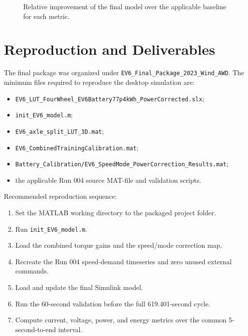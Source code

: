 \documentclass[11pt,letterpaper]{article}
\begin{document}
\begin{figure}[H]
\centering
{}
\caption{Relative improvement of the final model over the applicable baseline for each metric.}
\end{figure}

\section{Reproduction and Deliverables}

The final package was organized under
\texttt{EV6\_Final\_Package\_2023\_Wind\_AWD}. The minimum files required to
reproduce the desktop simulation are:

\begin{itemize}
  \item \texttt{EV6\_LUT\_FourWheel\_EV6Battery77p4kWh\_PowerCorrected.slx};
  \item \texttt{init\_EV6\_model.m};
  \item \texttt{EV6\_axle\_split\_LUT\_3D.mat};
  \item \texttt{EV6\_CombinedTrainingCalibration.mat};
  \item \texttt{Battery\_Calibration/EV6\_SpeedMode\_PowerCorrection\_Results.mat};
  \item the applicable Run 004 source MAT-file and validation scripts.
\end{itemize}

Recommended reproduction sequence:

\begin{enumerate}
  \item Set the MATLAB working directory to the packaged project folder.
  \item Run \texttt{init\_EV6\_model.m}.
  \item Load the combined torque gains and the speed/mode correction map.
  \item Recreate the Run 004 speed-demand timeseries and zero unused external commands.
  \item Load and update the final Simulink model.
  \item Run the 60-second validation before the full 619.401-second cycle.
  \item Compute current, voltage, power, and energy metrics over the common 5-second-to-end interval.
\end{enumerate}
\end{document}
